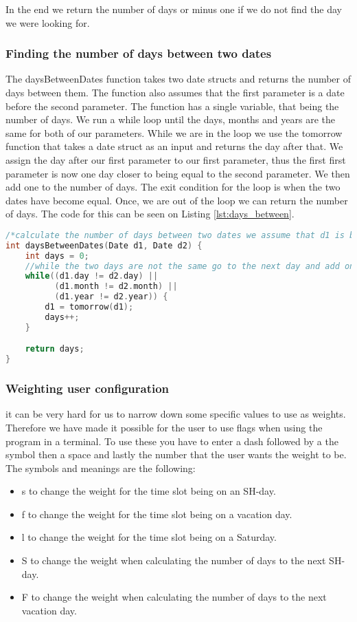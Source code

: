 In the end we return the number of days or minus one if we do not find the day we were looking for.

\subsubsection{Finding the number of days between two dates}
The daysBetweenDates function takes two date structs and returns the number of days between them. The function also assumes that the first parameter is a date before the second parameter. The function has a single variable, that being the number of days. We run a while loop until the days, months and years are the same for both of our parameters. While we are in the loop we use the tomorrow function that takes a date struct as an input and returns the day after that. We assign the day after our first parameter to our first parameter, thus the first first parameter is now one day closer to being equal to the second parameter. We then add one to the number of days. The exit condition for the loop is when the two dates have become equal. Once, we are out of the loop we can return the number of days. The code for this can be seen on Listing \ref{lst:days_between}.

\begin{lstlisting}[caption={Days between days.}, label={lst:days_between}, language=c]
/*calculate the number of days between two dates we assume that d1 is before d2*/
int daysBetweenDates(Date d1, Date d2) {
    int days = 0;
    //while the two days are not the same go to the next day and add one to our days counter
    while((d1.day != d2.day) ||
          (d1.month != d2.month) ||
          (d1.year != d2.year)) {
        d1 = tomorrow(d1);
        days++;
    } 

    return days;
}
\end{lstlisting}

\subsubsection{Weighting user configuration}\label{WeightingConfiguration}
it can be very hard for us to narrow down some specific values to use as weights. Therefore we have made it possible for the user to use flags when using the program in a terminal. To use these you have to enter a dash followed by a the symbol then a space and lastly the number that the user wants the weight to be. The symbols and meanings are the following:

\begin{itemize}
    \item s to change the weight for the time slot being on an SH-day.
    \item f to change the weight for the time slot being on a vacation day.
    \item l to change the weight for the time slot being on a Saturday.
    \item S to change the weight when calculating the number of days to the next SH-day.
    \item F to change the weight when calculating the number of days to the next vacation day.
\end{itemize}

